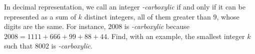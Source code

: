 In decimal representation, we call an integer \textit{-carboxylic} if and only if it can be represented as a sum of $k$ distinct integers, all of them greater than $9$, whose digits are the same. For instance, $2008$ is \textit{-carboxylic} because $2008=1111+666+99+88+44$. Find, with an example, the smallest integer $k$ such that $8002$ is \textit{-carboxylic}.